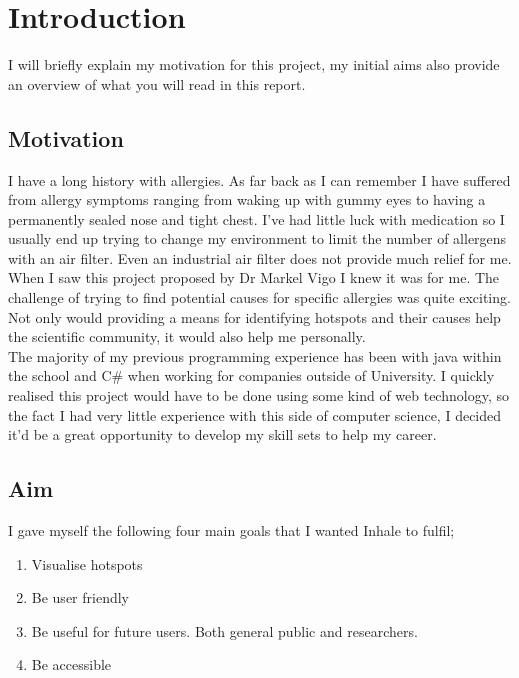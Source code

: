 \chapter{Introduction}
\label{cha:intro}

I will briefly explain my motivation for this project, my initial aims also provide an overview of what you will read in this report.

\section{Motivation} 
I have a long history with allergies. As far back as I can remember I have suffered from allergy symptoms ranging from waking up with gummy eyes to having a permanently sealed nose and tight chest. I've had little luck with medication so I usually end up trying to change my environment to limit the number of allergens with an air filter. Even an industrial air filter does not provide much relief for me.\\

When I saw this project proposed by Dr Markel Vigo I knew it was for me. The challenge of trying to find potential causes for specific allergies was quite exciting. Not only would providing a means for identifying hotspots and their causes help the scientific community, it would also help me personally.\\

The majority of my previous programming experience has been with java within the school and C\# when working for companies outside of University. I quickly realised this project would have to be done using some kind of web technology, so the fact I had very little experience with this side of computer science, I decided it'd be a great opportunity to develop my skill sets to help my career.\\

\section{Aim}
\label{sec:aim}

I gave myself the following four main goals that I wanted Inhale to fulfil;

\begin{enumerate}
  \item Visualise hotspots
  \item Be user friendly
  \item Be useful for future users. Both general public and researchers.
  \item Be accessible
\end{enumerate}


